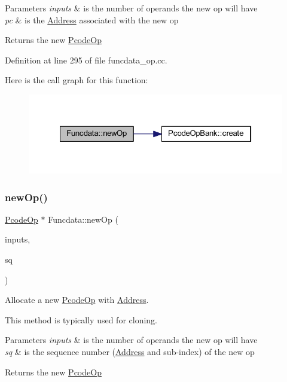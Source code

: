 \begin{DoxyParams}{Parameters}
{\em inputs} & is the number of operands the new op will have \\
\hline
{\em pc} & is the \mbox{\hyperlink{class_address}{Address}} associated with the new op \\
\hline
\end{DoxyParams}
\begin{DoxyReturn}{Returns}
the new \mbox{\hyperlink{class_pcode_op}{Pcode\+Op}} 
\end{DoxyReturn}


Definition at line 295 of file funcdata\+\_\+op.\+cc.

Here is the call graph for this function\+:
\nopagebreak
\begin{figure}[H]
\begin{center}
\leavevmode
\includegraphics[width=322pt]{class_funcdata_a1b1e9831bb4b1c65df6950ae1f15e0be_cgraph}
\end{center}
\end{figure}
\mbox{\label{class_funcdata_a0d122aa09d739e59a5107338f8ecd8ab}} 
\subsubsection{\texorpdfstring{newOp()}{newOp()}\hspace{0.1cm}{\footnotesize\ttfamily [2/2]}}
{\footnotesize\ttfamily \mbox{\hyperlink{class_pcode_op}{Pcode\+Op}} $\ast$ Funcdata\+::new\+Op (\begin{DoxyParamCaption}\item[{int4}]{inputs,  }\item[{const \mbox{\hyperlink{class_seq_num}{Seq\+Num}} \&}]{sq }\end{DoxyParamCaption})}



Allocate a new \mbox{\hyperlink{class_pcode_op}{Pcode\+Op}} with \mbox{\hyperlink{class_address}{Address}}. 

This method is typically used for cloning. 
\begin{DoxyParams}{Parameters}
{\em inputs} & is the number of operands the new op will have \\
\hline
{\em sq} & is the sequence number (\mbox{\hyperlink{class_address}{Address}} and sub-\/index) of the new op \\
\hline
\end{DoxyParams}
\begin{DoxyReturn}{Returns}
the new \mbox{\hyperlink{class_pcode_op}{Pcode\+Op}} 
\end{DoxyReturn}


